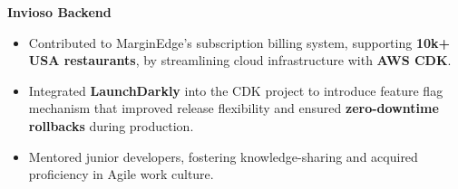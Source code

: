 \documentclass[10pt,a4paper,ragged2e,withhyper]{altacv}
\begin{document}

\tagline{}


\makecvheader


\textbf{Invioso Backend}
\begin{itemize}
\item Contributed to MarginEdge’s subscription billing system, supporting \textbf{10k+ USA restaurants}, by streamlining cloud infrastructure with \textbf{AWS CDK}.
\item Integrated \textbf{LaunchDarkly}{\href{https://launchdarkly.com/}{\faLink}} into the CDK project to introduce feature flag mechanism that improved release flexibility and ensured \textbf{zero-downtime rollbacks} during production.
\item Mentored junior developers, fostering knowledge-sharing and acquired proficiency in Agile work culture.
\end{itemize}
\end{document}

